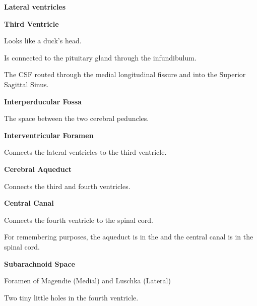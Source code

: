 \begin{coloredlist}
    \item \textbf{Lateral ventricles}
    \begin{coloredlist}
        \item 
    \end{coloredlist}
    \item \textbf{Third Ventricle}
    \begin{coloredlist}
        \item Looks like a duck's head.
        \item Is connected to the pituitary gland through the infundibulum.
    \end{coloredlist}
    \item The CSF routed through the medial longitudinal fissure and into the Superior Sagittal Sinus.
    \item \textbf{Interperducular Fossa}
    \begin{coloredlist}
        \item The space between the two cerebral peduncles.
    \end{coloredlist}
    \item \textbf{Interventricular Foramen}
    \begin{coloredlist}
        \item Connects the lateral ventricles to the third ventricle.
    \end{coloredlist}
    \item \textbf{Cerebral Aqueduct}
    \begin{coloredlist}
        \item Connects the third and fourth ventricles.
    \end{coloredlist}
    \item \textbf{Central Canal}
    \begin{coloredlist}
        \item Connects the fourth ventricle to the spinal cord.
        \item For remembering purposes, the  aqueduct is in the  and the central canal is in the spinal cord.
    \end{coloredlist}
    \item \textbf{Subarachnoid Space}
    \begin{coloredlist}
        \item Foramen of Magendie (Medial) and Luschka (Lateral)
        \begin{coloredlist}
            \item Two tiny little holes in the fourth ventricle.
        \end{coloredlist}
    \end{coloredlist} 
\end{coloredlist}

